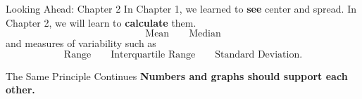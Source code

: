 \documentclass[aspectratio=169]{beamer}
\begin{document}

\begin{frame}{Looking Ahead: Chapter 2}
  In Chapter 1, we learned to \textbf{see} center and spread.
  \vspace{0.2cm}
  In Chapter 2, we will learn to \textbf{calculate} them.
  \[
    \text{Mean} \qquad \text{Median}
  \]
  and measures of variability such as
  \[
    \text{Range} \qquad \text{Interquartile Range} \qquad \text{Standard Deviation}.
  \]
  \vspace{0.25cm}
  \begin{block}{The Same Principle Continues}
    \textbf{Numbers and graphs should support each other.}
  \end{block}
\end{frame}
\end{document}
